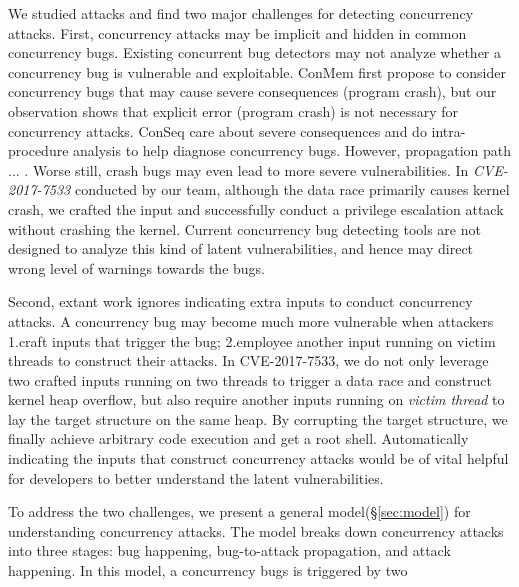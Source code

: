 We studied \nattacks attacks and find two major challenges for detecting concurrency attacks. 
First, concurrency attacks may be implicit and hidden in common concurrency bugs. 
Existing concurrent bug detectors may not 
analyze whether a concurrency bug is vulnerable and exploitable.  
ConMem\cite{conmem:asplos10} first propose to 
consider concurrency bugs that may cause severe consequences (\eg program crash), 
but our observation shows that explicit error (\eg program crash) is not necessary for concurrency 
attacks.
ConSeq\cite{conseq:asplos11} care about severe consequences and do intra-procedure analysis to help diagnose concurrency bugs. 
However, propagation path ... .
%
Worse still, crash bugs may even lead to more severe vulnerabilities. 
In \emph{CVE-2017-7533} conducted by our team, although the data race primarily causes kernel crash, 
we crafted the input and successfully conduct a privilege escalation attack without crashing the kernel.
Current concurrency bug detecting tools are not designed to analyze this kind of latent vulnerabilities, 
and hence may direct wrong level of warnings towards the bugs.  


Second, extant work ignores indicating extra inputs to conduct concurrency attacks.
A concurrency bug may become much more vulnerable when attackers 1.craft inputs that trigger the bug; 
2.employee another input running on victim threads to construct their attacks. 
In CVE-2017-7533, we do not only leverage two crafted inputs running on two threads to trigger a data race and construct kernel heap overflow, 
but also require another inputs running on \emph{victim thread} to lay the target structure on the same heap. 
By corrupting the target structure, we finally achieve arbitrary code execution and get a root shell. 
Automatically indicating the inputs that construct concurrency attacks 
would be of vital helpful for developers to better understand the latent vulnerabilities.


To address the two challenges, we present a general model(\S\ref{sec:model}) 
for understanding concurrency attacks.
The model breaks down concurrency attacks into three stages: bug happening, 
bug-to-attack propagation, and attack happening. In this model, 
a concurrency bugs is triggered by two 



